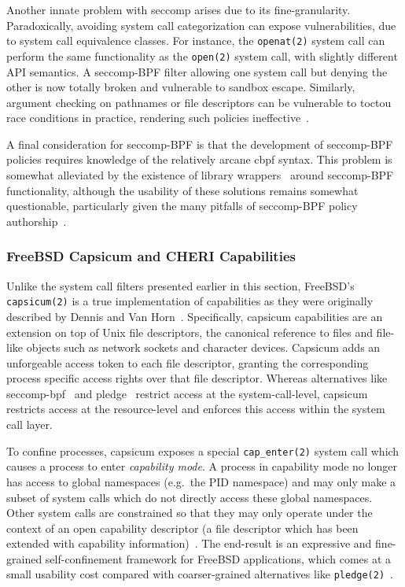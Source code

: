 Another innate problem with seccomp arises due to its fine-granularity. Paradoxically,
avoiding system call categorization can expose vulnerabilities, due to system call
equivalence classes. For instance, the \texttt{openat(2)} system call can perform the same
functionality as the \texttt{open(2)} system call, with slightly different API semantics.
A seccomp-BPF filter allowing one system call but denying the other is now totally broken
and vulnerable to sandbox escape.  Similarly, argument checking on pathnames or file
descriptors can be vulnerable to \gls{toctou} race conditions in practice, rendering such
policies ineffective~\cite{anderson2017_comparison}.

A final consideration for seccomp-BPF is that the development of seccomp-BPF policies
requires knowledge of the relatively arcane \gls{cbpf} syntax. This problem is somewhat
alleviated by the existence of library wrappers~\cite{libseccomp} around seccomp-BPF
functionality, although the usability of these solutions remains somewhat questionable,
particularly given the many pitfalls of seccomp-BPF policy
authorship~\cite{anderson2017_comparison}.

\subsubsection*{FreeBSD Capsicum and CHERI Capabilities}
\label{sss:capsicum}

Unlike the system call filters presented earlier in this section, FreeBSD's
\texttt{capsicum(2)} \cite{watson2010_capsicum, anderson2017_comparison} is a true
implementation of capabilities as they were originally described by Dennis and Van
Horn~\cite{dennis1966_semantics}. Specifically, capsicum capabilities are an extension on
top of Unix file descriptors, the canonical reference to files and file-like objects such
as network sockets and character devices. Capsicum adds an unforgeable access token to
each file descriptor, granting the corresponding process specific access rights over that
file descriptor. Whereas alternatives like seccomp-bpf~\cite{seccomp} and
pledge~\cite{pledge} restrict access at the system-call-level, capsicum restricts access
at the resource-level and enforces this access within the system call layer.

To confine processes, capsicum exposes a special \texttt{cap\_enter(2)} system call which
causes a process to enter \textit{capability mode}. A process in capability mode no longer
has access to global namespaces (e.g.~the PID namespace) and may only make a subset of
system calls which do not directly access these global namespaces. Other system calls are
constrained so that they may only operate under the context of an open capability
descriptor (a file descriptor which has been extended with capability
information)~\cite{watson2010_capsicum}. The end-result is an expressive and fine-grained
self-confinement framework for FreeBSD applications, which comes at a small usability cost
compared with coarser-grained alternatives like \texttt{pledge(2)}~\cite{pledge}.

